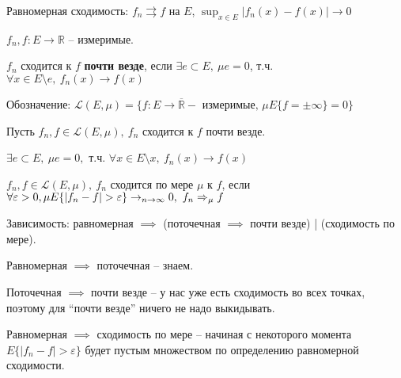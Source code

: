 Равномерная сходимость: $f_n \rightrightarrows f$ на $E$, $\sup_{x \in E} |f_n(x) - f(x)| \rightarrow 0$

\begin{definition}
    $f_n, f: E \rightarrow \mathbb{R}$ -- измеримые.

    $f_n$ сходится к $f$ \textbf{почти везде}, если $\exists e \subset E, \ \mu e = 0$, т.ч. $\forall x \in E \setminus e, \ f_n(x) \rightarrow f(x)$

    \begin{remark}
        Обозначение: $\mathscr{L}(E, \mu) = \{ f: E \rightarrow \overline{\mathbb{R}} - \text{ измеримые, } \mu E\{ f = \pm \infty\} = 0\}$
    \end{remark}

    Пусть $f_n, f \in \mathscr{L}(E, \mu), \ f_n$ сходится к $f$ почти везде.

    $\exists e \subset E, \ \mu e = 0, $ т.ч. $\forall x \in E \setminus x, \ f_n(x) \rightarrow f(x)$
\end{definition}


\begin{definition}
    $f_n, f \in \mathscr{L}(E, \mu), \ f_n$ сходится по мере $\mu$ к $f$, если $\forall \varepsilon > 0, \\ \mu E \{ | f_n - f | > \varepsilon \} \rightarrow_{n \rightarrow \infty} 0, \ f_n \Rightarrow_{\mu} f$
\end{definition}

\begin{remark}
    Зависимость: равномерная $\implies$ (поточечная $\implies$ почти везде) | (сходимость по мере).

    Равномерная $\implies$ поточечная -- знаем.

    Поточечная $\implies$ почти везде -- у нас уже есть сходимость во всех точках, поэтому для ``почти везде'' ничего не надо выкидывать.

    Равномерная $\implies$ сходимость по мере -- начиная с некоторого момента $E\{|f_n - f| > \varepsilon \}$ будет пустым множеством по определению равномерной сходимости.
\end{remark}

